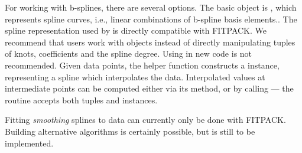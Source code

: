 For working with b-splines, there are several options. The basic object is , which represents spline curves, i.e., linear combinations of b-spline basis elements.\cite{deBoor1978}. The spline
representation used by  is directly compatible with FITPACK. We
recommend that users work with  objects instead of directly
manipulating  tuples of knots, coefficients and the spline degree.
%
Using  in new code is not recommended. Given data points,
the helper function  constructs a 
instance, representing a spline which interpolates the data. Interpolated values
at intermediate points can be computed either via its  method,
or by calling  --- the  routine
accepts both  tuples and  instances.

Fitting \emph{smoothing} splines to data can currently only be done with FITPACK. Building alternative algorithms is certainly possible, but is still to be implemented.

